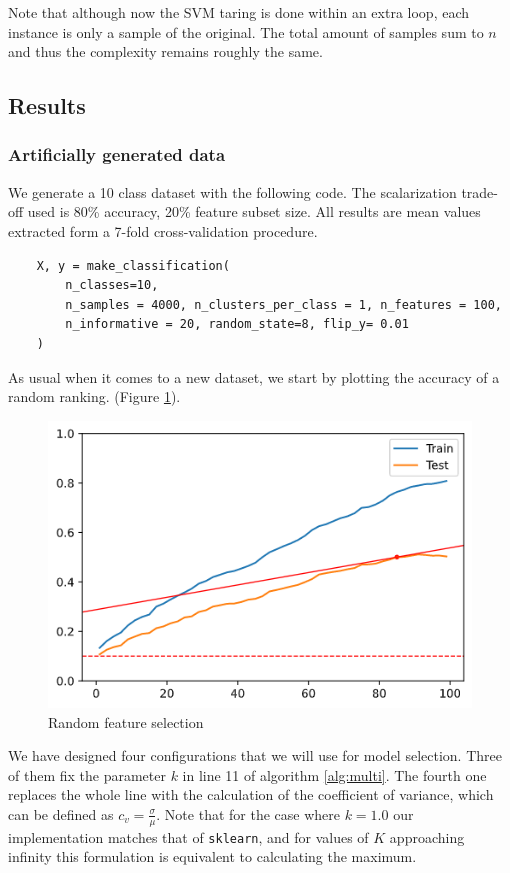 Note that although now the SVM taring is done within an extra loop, each in\-stance is only a sample of the original. The total amount of samples sum to $n$ and thus the complexity remains roughly the same. 

\subsection{Results}

\subsubsection*{Artificially generated data}

We generate a 10 class dataset with the following code.  The scalarization trade-off used is 80\% accuracy, 20\% feature subset size. All results are mean values extracted form a 7-fold cross-validation procedure.

\begin{verbatim}
    X, y = make_classification(
        n_classes=10,
        n_samples = 4000, n_clusters_per_class = 1, n_features = 100, 
        n_informative = 20, random_state=8, flip_y= 0.01
    )
\end{verbatim}

As usual when it comes to a new dataset, we start by plotting the accuracy of a random ranking. (Figure \ref{fig:ch5.multi.random}).

\begin{figure}[h]
    \centering
    \includegraphics[width=0.5\linewidth]{img/ch5/multi/random.png}
    \caption[Multi-class criteria: Random feature selection]{Random feature selection}
    \label{fig:ch5.multi.random}
\end{figure}

We have designed four configurations that we will use for model selection. Three of them fix the parameter $k$ in line 11 of algorithm \ref{alg:multi}. The fourth one replaces the whole line with the calculation of the coefficient of variance, which can be defined as $c_v = \frac{\sigma}{\mu}$. Note that for the case where $k = 1.0$ our implementation matches that of \texttt{sklearn}, and for values of $K$ approaching infinity this formulation is equivalent to calculating the maximum.

